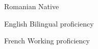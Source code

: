 
\begin{cvskills}

  \cvskill
  {Romanian} %
  {Native} %

  \cvskill
  {English} %
  {Bilingual proficiency} %

  \cvskill
  {French} %
  {Working proficiency} %

\end{cvskills}
